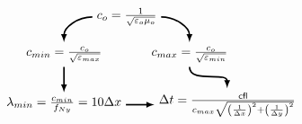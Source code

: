 \documentclass[10pt]{article}
\begin{document}
\[\begin{tikzpicture}[>=latex]
%
\node[minimum size=0.5cm] at (0,0)  (co) {$c_o = \frac{1}{\sqrt{\varepsilon_o\mu_o}}$};
\node[minimum size=0.5cm] at (-5em,-3em)  (cmin) {$c_{min} = \frac{c_o}{\sqrt{\varepsilon_{max}}}$};
\node[minimum size=0.5cm] at (5em,-3em)  (cmax) {$c_{max} = \frac{c_o}{\sqrt{\varepsilon_{min}}}$};
\node[minimum size=0.5cm] at (-5em,-7em)  (lmin) {$\lambda_{min} = \frac{c_{min}}{f_{Ny}} = 10\Delta x$};
\node[minimum size=0.5cm] at (8em,-7em)  (dt) {$\Delta t = \frac{{\sf cfl}}{c_{max}\sqrt{ \left(\frac{1}{\Delta x}\right)^2 + \left(\frac{1}{\Delta y}\right)^2}}$};
%
\draw[->,very thick,black]
  (co) to[out=180,in=90] (cmin);
\draw[->,very thick,black]
  (co) to[out=0,in=90] (cmax);
\draw[->,very thick,black]
  (cmin) to[out=270,in=90] (lmin);
\draw[->,very thick,black]
  (lmin) to[out=0,in=180] (dt);
\draw[->,very thick,black]
  (cmax) to[out=270,in=90] (dt);
%
\end{tikzpicture}
\]
\end{document}
